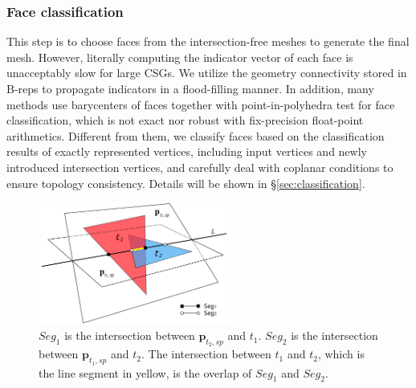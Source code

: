 \documentclass[10pt,journal,compsoc]{IEEEtran}
\begin{document}

\subsubsection{Face classification}

This step is to choose faces from the intersection-free meshes to generate the final mesh. However, literally computing the indicator vector of each face is unacceptably slow for large CSGs. We utilize the geometry connectivity stored in B-reps to propagate indicators in a flood-filling manner. In addition, many methods use barycenters of faces together with point-in-polyhedra test for face classification, which is not exact nor robust with fix-precision float-point arithmetics. Different from them, we classify faces based on the classification results of exactly represented vertices, including input vertices and newly introduced intersection vertices, and carefully deal with coplanar conditions to ensure topology consistency. Details will be shown in \S\ref{sec:classification}.

\begin{figure}[t]
\centering
\includegraphics[width=2.5in]{projection}
\caption{$Seg_1$ is the intersection between $\bm{p}_{t_2, sp}$ and $t_1$. $Seg_2$ is the intersection between $\bm{p}_{t_1, sp}$ and $t_2$. The intersection between $t_1$ and $t_2$, which is the line segment in yellow, is the overlap of $Seg_1$ and $Seg_2$.}
\label{fig_projection}
\end{figure}
\end{document}
